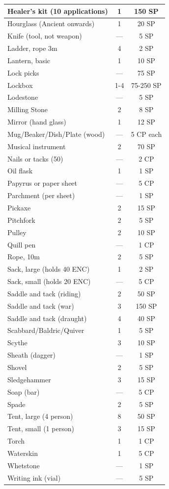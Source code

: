 \documentclass[10pt]{article}
\begin{document}
\begin{longtable}[c]{|l|c|c|}
\hline
Healer's kit (10 applications) & 1 & 150 SP \\
\hline
Hourglass (Ancient onwards) & 1 & 20 SP \\
\hline
Knife (tool, not weapon) & — & 5 SP \\
\hline
Ladder, rope 3m & 4 & 2 SP \\
\hline
Lantern, basic & 1 & 10 SP \\
\hline
Lock picks & — & 75 SP \\
\hline
Lockbox & 1-4 & 75-250 SP \\
\hline
Lodestone & — & 5 SP \\
\hline
Milling Stone & 2 & 8 SP \\
\hline
Mirror (hand glass) & 1 & 12 SP \\
\hline
Mug/Beaker/Dish/Plate (wood) & — & 5 CP each \\
\hline
Musical instrument & 2 & 70 SP \\
\hline
Nails or tacks (50) & — & 2 CP \\
\hline
Oil flask & 1 & 1 SP \\
\hline
Papyrus or paper sheet & — & 5 CP \\
\hline
Parchment (per sheet) & — & 1 SP \\
\hline
Pickaxe & 2 & 15 SP \\
\hline
Pitchfork & 2 & 5 SP \\
\hline
Pulley & 2 & 10 SP \\
\hline
Quill pen & — & 1 CP \\
\hline
Rope, 10m & 2 & 5 SP \\
\hline
Sack, large (holds 40 ENC) & 1 & 2 SP \\
\hline
Sack, small (holds 20 ENC) & — & 5 CP \\
\hline
Saddle and tack (riding) & 2 & 50 SP \\
\hline
Saddle and tack (war) & 3 & 150 SP \\
\hline
Saddle and tack (draught) & 4 & 40 SP \\
\hline
Scabbard/Baldric/Quiver & 1 & 5 SP \\
\hline
Scythe & 3 & 10 SP \\
\hline
Sheath (dagger) & — & 1 SP \\
\hline
Shovel & 2 & 5 SP \\
\hline
Sledgehammer & 3 & 15 SP \\
\hline
Soap (bar) & — & 5 CP \\
\hline
Spade & 2 & 5 SP \\
\hline
Tent, large (4 person) & 8 & 50 SP \\
\hline
Tent, small (1 person) & 3 & 15 SP \\
\hline
Torch & 1 & 1 CP \\
\hline
Waterskin & 1 & 5 CP \\
\hline
Whetstone & — & 1 SP \\
\hline
Writing ink (vial) & — & 5 SP \\
\hline
\end{longtable}
\end{document}
